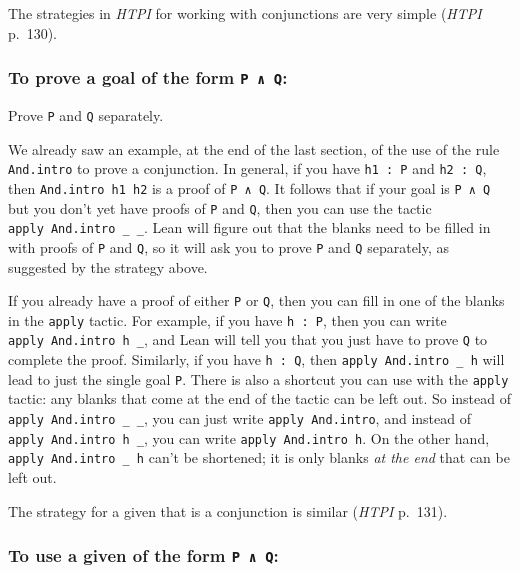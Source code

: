 \documentclass[
  letterpaper,
  DIV=11,
  numbers=noendperiod]{scrreprt}
\newenvironment{ind}
	{\begin{list}{}{\setlength{\leftmargin}{1em}}\item\relax}
	{\end{list}}
\theoremstyle{remark}
\begin{document}
The strategies in \emph{HTPI} for working with conjunctions are very
simple (\emph{HTPI} p.~130).

\hypertarget{to-prove-a-goal-of-the-form-p-q-1}{%
\subsubsection{\texorpdfstring{To prove a goal of the form
\texttt{P\ ∧\ Q}:}{To prove a goal of the form P ∧ Q:}}\label{to-prove-a-goal-of-the-form-p-q-1}}

\begin{ind}
Prove \texttt{P} and \texttt{Q} separately.

\end{ind}

We already saw an example, at the end of the last section, of the use of
the rule \texttt{And.intro} to prove a conjunction. In general, if you
have \texttt{h1\ :\ P} and \texttt{h2\ :\ Q}, then
\texttt{And.intro\ h1\ h2} is a proof of \texttt{P\ ∧\ Q}. It follows
that if your goal is \texttt{P\ ∧\ Q} but you don't yet have proofs of
\texttt{P} and \texttt{Q}, then you can use the tactic
\texttt{apply\ And.intro\ \_\ \_}. Lean will figure out that the blanks
need to be filled in with proofs of \texttt{P} and \texttt{Q}, so it
will ask you to prove \texttt{P} and \texttt{Q} separately, as suggested
by the strategy above.

If you already have a proof of either \texttt{P} or \texttt{Q}, then you
can fill in one of the blanks in the \texttt{apply} tactic. For example,
if you have \texttt{h\ :\ P}, then you can write
\texttt{apply\ And.intro\ h\ \_}, and Lean will tell you that you just
have to prove \texttt{Q} to complete the proof. Similarly, if you have
\texttt{h\ :\ Q}, then \texttt{apply\ And.intro\ \_\ h} will lead to
just the single goal \texttt{P}. There is also a shortcut you can use
with the \texttt{apply} tactic: any blanks that come at the end of the
tactic can be left out. So instead of \texttt{apply\ And.intro\ \_\ \_},
you can just write \texttt{apply\ And.intro}, and instead of
\texttt{apply\ And.intro\ h\ \_}, you can write
\texttt{apply\ And.intro\ h}. On the other hand,
\texttt{apply\ And.intro\ \_\ h} can't be shortened; it is only blanks
\emph{at the end} that can be left out.

The strategy for a given that is a conjunction is similar (\emph{HTPI}
p.~131).

\hypertarget{to-use-a-given-of-the-form-p-q-1}{%
\subsubsection{\texorpdfstring{To use a given of the form
\texttt{P\ ∧\ Q}:}{To use a given of the form P ∧ Q:}}\label{to-use-a-given-of-the-form-p-q-1}}
\end{document}
